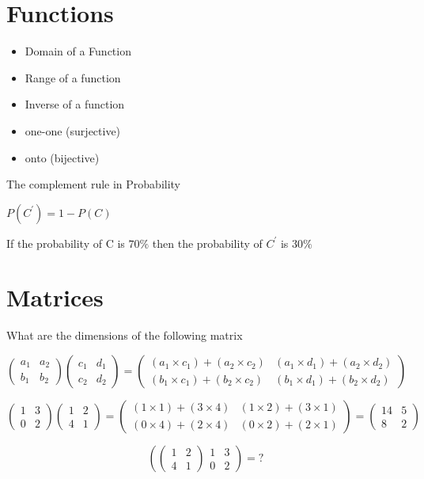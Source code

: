 \documentclass{article}
\begin{document}
\section*{Functions}
\begin{itemize}
\item Domain of a Function
\item Range of a function
\item Inverse of a function
\end{itemize}
\begin{itemize}
\item one-one (surjective)
\item onto (bijective)
\end{itemize}



The complement rule in Probability

$P(C^{\prime}) = 1- P(C)$

 

If the probability of C is $70 \%$ then the probability of $C^{\prime}$ is $30\%$
\section{Matrices}

What are the dimensions of the following matrix


\[ \left(
\begin{array}{cc}
a_1 & a_2 \\ 
b_1 & b_2
\end{array} \right)\left(
\begin{array}{cc}
c_1 & d_1 \\ 
c_2 & d_2
\end{array} \right) = \left(
\begin{array}{cc}
(a_1 \times c_1) + (a_2 \times c_2) & (a_1 \times d_1) + (a_2 \times d_2) \\ 
(b_1 \times c_1) + (b_2 \times c_2) & (b_1 \times d_1) + (b_2 \times d_2)
\end{array} \right) \]

\bigskip
\large{
\[ \left(
\begin{array}{cc}
1 & 3 \\ 
0 & 2
\end{array} \right)\left(
\begin{array}{cc}
1 & 2 \\ 
4 & 1
\end{array} \right) = \left(
\begin{array}{cc}
(1 \times 1) + (3 \times 4) & (1 \times 2) + (3 \times 1) \\ 
(0 \times 4) + (2 \times 4) & (0 \times 2) + (2 \times 1)
\end{array} \right) = \left(
\begin{array}{cc}
14 & 5 \\ 
8 & 2
\end{array} \right) \]
}

\[ \left(
\left(
\begin{array}{cc}
1 & 2 \\ 
4 & 1
\end{array} \right)
\begin{array}{cc}
1 & 3 \\ 
0 & 2
\end{array} \right) = ? \]
\end{document}
